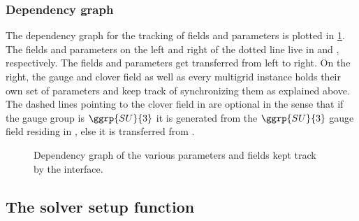 \subsubsection{Dependency graph}

The dependency graph for the tracking of fields and parameters is plotted in \cref{fig:dep}.
The fields and parameters on the left and right of the dotted line live in \openqxd and \quda, respectively.
The fields and parameters get transferred from left to right.
On the right, the gauge and clover field as well as every multigrid instance holds their own set of parameters and keep track of synchronizing them as explained above.
The dashed lines pointing to the clover field in \quda are optional in the sense that if the gauge group is $\ggrp{SU}{3}$ it is generated from the $\ggrp{SU}{3}$ gauge field residing in \quda, else it is transferred from \openqxd.
\begin{figure}
  
  \caption{Dependency graph of the various parameters and fields kept track by the interface.}
  \label{fig:dep}
\end{figure}

\subsection{The solver setup function}
\label{sec:interface:getsolverhandle}

